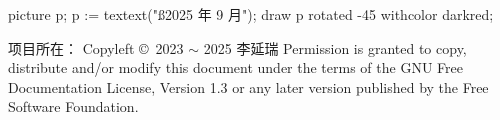 picture p; p := textext("{\ss 2025 年 9 月}");
draw p rotated -45 withcolor darkred;
\stopuniqueMPgraphic
{}

\blank[line]
项目所在：{\tta{}}
\vfill
Copyleft \copyright\  2023 $\sim$ 2025  李延瑞
\blank
Permission is granted to copy, distribute and/or modify this document under the terms of the GNU Free Documentation License, Version 1.3 or any later version published by the Free Software Foundation.
\stopstandardmakeup
\setupbackgrounds[page][background=]
